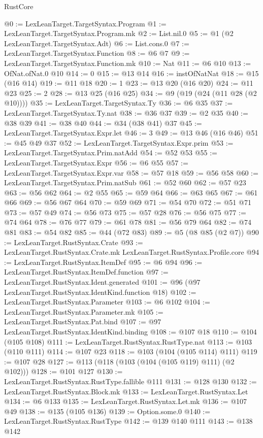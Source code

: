 \begin{lexlean}{RustCore}
\begin{coremodule}
@0 := LexLeanTarget.TargetSyntax.Program
@1 := LexLeanTarget.TargetSyntax.Program.mk
@2 := List.nil.{0}
@5 := @1 (@2 LexLeanTarget.TargetSyntax.Adt)
@6 := List.cons.{0}
@7 := LexLeanTarget.TargetSyntax.Function
@8 := @6 @7
@9 := LexLeanTarget.TargetSyntax.Function.mk
@10 := Nat
@11 := @6 @10
@13 := OfNat.ofNat.{0} @10
@14 := 0
@15 := @13 @14
@16 := instOfNatNat
@18 := @15 (@16 @14)
@19 := @11 @18
@20 := 1
@23 := @13 @20 (@16 @20)
@24 := @11 @23
@25 := 2
@28 := @13 @25 (@16 @25)
@34 := @9 (@19 (@24 (@11 @28 (@2 @10))))
@35 := LexLeanTarget.TargetSyntax.Ty
@36 := @6 @35
@37 := LexLeanTarget.TargetSyntax.Ty.nat
@38 := @36 @37
@39 := @2 @35
@40 := @38 @39
@41 := @38 @40
@44 := @34 (@38 @41) @37
@45 := LexLeanTarget.TargetSyntax.Expr.let
@46 := 3
@49 := @13 @46 (@16 @46)
@51 := @45 @49 @37
@52 := LexLeanTarget.TargetSyntax.Expr.prim
@53 := LexLeanTarget.TargetSyntax.Prim.natAdd
@54 := @52 @53
@55 := LexLeanTarget.TargetSyntax.Expr
@56 := @6 @55
@57 := LexLeanTarget.TargetSyntax.Expr.var
@58 := @57 @18
@59 := @56 @58
@60 := LexLeanTarget.TargetSyntax.Prim.natSub
@61 := @52 @60
@62 := @57 @23
@63 := @56 @62
@64 := @2 @55
@65 := @59 @64
@66 := @63 @65
@67 := @61 @66
@69 := @56 @67 @64
@70 := @59 @69
@71 := @54 @70
@72 := @51 @71
@73 := @57 @49
@74 := @56 @73
@75 := @57 @28
@76 := @56 @75
@77 := @74 @64
@78 := @76 @77
@79 := @61 @78
@81 := @56 @79 @64
@82 := @74 @81
@83 := @54 @82
@85 := @44 (@72 @83)
@89 := @5 (@8 @85 (@2 @7))
@90 := LexLeanTarget.RustSyntax.Crate
@93 := LexLeanTarget.RustSyntax.Crate.mk LexLeanTarget.RustSyntax.Profile.core
@94 := LexLeanTarget.RustSyntax.ItemDef
@95 := @6 @94
@96 := LexLeanTarget.RustSyntax.ItemDef.function
@97 := LexLeanTarget.RustSyntax.Ident.generated
@101 := @96 (@97 LexLeanTarget.RustSyntax.IdentKind.function @18)
@102 := LexLeanTarget.RustSyntax.Parameter
@103 := @6 @102
@104 := LexLeanTarget.RustSyntax.Parameter.mk
@105 := LexLeanTarget.RustSyntax.Pat.bind
@107 := @97 LexLeanTarget.RustSyntax.IdentKind.binding
@108 := @107 @18
@110 := @104 (@105 @108)
@111 := LexLeanTarget.RustSyntax.RustType.nat
@113 := @103 (@110 @111)
@114 := @107 @23
@118 := @103 (@104 (@105 @114) @111)
@119 := @107 @28
@127 := @113 (@118 (@103 (@104 (@105 @119) @111) (@2 @102)))
@128 := @101 @127
@130 := LexLeanTarget.RustSyntax.RustType.fallible @111
@131 := @128 @130
@132 := LexLeanTarget.RustSyntax.Block.mk
@133 := LexLeanTarget.RustSyntax.Let
@134 := @6 @133
@135 := LexLeanTarget.RustSyntax.Let.mk
@136 := @107 @49
@138 := @135 (@105 @136)
@139 := Option.some.{0}
@140 := LexLeanTarget.RustSyntax.RustType
@142 := @139 @140 @111
@143 := @138 @142

\end{coremodule}
\end{lexlean}

